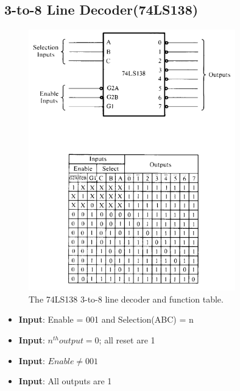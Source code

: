 \subsection{3-to-8 Line Decoder(74LS138)}
\begin{figure}[h!]
  \centering
  \includegraphics[width = 0.8\textwidth]{./figures/Decoder_3_to_8.png}
  \caption{The 74LS138 3-to-8 line decoder and function table.}
  \label{}
\end{figure}

\begin{itemize}
  \item \textbf{Input}: Enable = 001 and Selection(ABC) = n
  \item \textbf{Input}: $n^{th}output = 0$; all reset are 1
\end{itemize}
\begin{itemize}
  \item \textbf{Input}: $Enable \neq 001$
  \item \textbf{Input}: All outputs are 1
\end{itemize}


